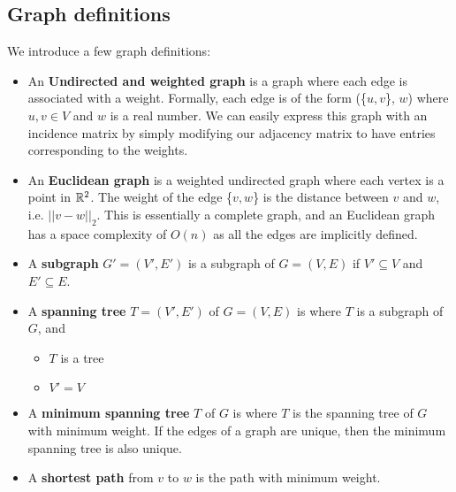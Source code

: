 \documentclass[a4paper]{article}
\begin{document}
\subsection{Graph definitions}
We introduce a few graph definitions:
\begin{itemize}
	\item An \textbf{Undirected and weighted graph} is a graph where each edge is associated with a weight. Formally, each edge is of the form (\{$u, v$\}, $w$) where $u, v \in V$ and $w$ is a real number. We can easily express this graph with an incidence matrix by simply modifying our adjacency matrix to have entries corresponding to the weights.
	\item An \textbf{Euclidean graph} is a weighted undirected graph where each vertex is a point in $\mathbb{R}^2$. The weight of the edge \{$v,w$\} is the distance between $v$ and $w$, i.e. $||v-w||_2$. This is essentially a complete graph, and an Euclidean graph has a space complexity of $O(n)$ as all the edges are implicitly defined.
	\item A \textbf{subgraph} $G'=(V',E')$ is a subgraph of $G=(V,E)$ if $V'\subseteq V$ and $E'\subseteq E$.
	\item A \textbf{spanning tree} $T=(V',E')$ of $G=(V,E)$ is where $T$ is a subgraph of $G$, and
	\begin{itemize}
		\item $T$ is a tree
		\item $V' = V$
	\end{itemize}
	\item A \textbf{minimum spanning tree} $T$ of $G$ is where $T$ is the spanning tree of $G$ with minimum weight. If the edges of a graph are unique, then the minimum spanning tree is also unique.
	\item A \textbf{shortest path} from $v$ to $w$ is the path with minimum weight.
\end{itemize}
\end{document}
